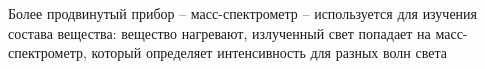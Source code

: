 \documentclass[12pt]{article}
\begin{document}
Более продвинутый прибор -- масс-спектрометр -- используется для изучения состава вещества: вещество нагревают, излученный свет попадает на масс-спектрометр, который определяет интенсивность для разных волн света

\end{document}

